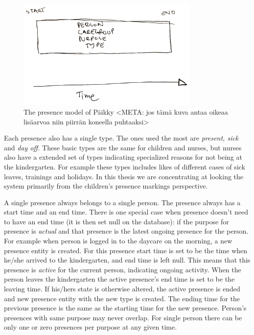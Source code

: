\begin{figure}[t]
\begin{center}
\includegraphics[width=0.8\textwidth]{assets/presencemodel.png}
\end{center}
\caption{The presence model of Päikky <META: jos tämä kuva antaa oikeaa lisäarvoa niin piirrän koneella puhtaaksi>}
\label{fig:architechture}
\end{figure}



Each presence also has a single type. The ones used the most are \textit{present, sick} and \textit{day off.} These basic types are the same for children and nurses, but nurses also have a extended set of types indicating specialized reasons for not being at the kindergarten. For example these types includes likes of different cases of sick leaves, trainings and holidays. In this thesis we are concentrating at looking the system primarily from the children's presence markings perspective.

A single presence always belongs to a single person. The presence always has a start time and an end time. There is one special case when presence doesn't need to have an end time (it is then set null on the database): if the purpose for presence is \textit{actual} and that presence is the latest ongoing presence for the person. For example when person is logged in to the daycare on the morning, a new presence entity is created. For this presence start time is set to be the time when he/she arrived to the kindergarten, and end time is left null. This means that this presence is \textit{active} for the current person, indicating ongoing activity. When the person leaves the kindergarten the active presence's end time is set to be the leaving time. If his/hers state is otherwise altered, the active presence is ended and new presence entity with the new type is created. The ending time for the previous presence is the same as the starting time for the new presence. Person's presences with same purpose may never overlap. For single person there can be only one or zero presences per purpose at any given time.



